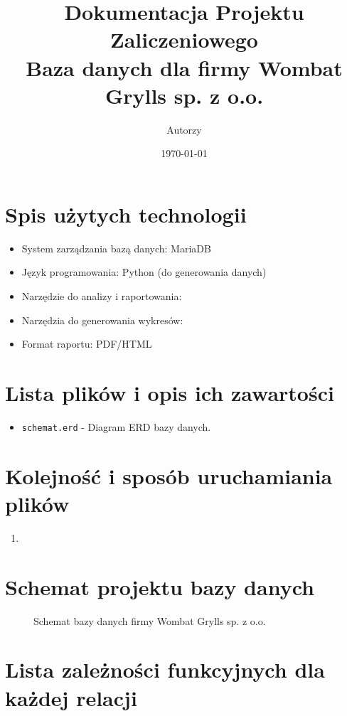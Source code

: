 \documentclass{article}
\title{Dokumentacja Projektu Zaliczeniowego\\ \huge Baza danych dla firmy Wombat Grylls sp. z o.o.}
\author{Autorzy}
\date{\today}
\begin{document}
\maketitle

\newpage

\tableofcontents
\newpage

\section{Spis użytych technologii}
\begin{itemize}
    \item System zarządzania bazą danych: MariaDB
    \item Język programowania: Python (do generowania danych)
    \item Narzędzie do analizy i raportowania: 
    \item Narzędzia do generowania wykresów: 
    \item Format raportu: PDF/HTML
\end{itemize}

\section{Lista plików i opis ich zawartości}
\begin{itemize}
    \item \texttt{schemat.erd} - Diagram ERD bazy danych.
\end{itemize}

\section{Kolejność i sposób uruchamiania plików}
\begin{enumerate}
    \item 
\end{enumerate}

\section{Schemat projektu bazy danych}
\begin{figure}[h!]
\centering
\caption{Schemat bazy danych firmy Wombat Grylls sp. z o.o.}
\end{figure}

\newpage

\section{Lista zależności funkcyjnych dla każdej relacji}
\end{document}
